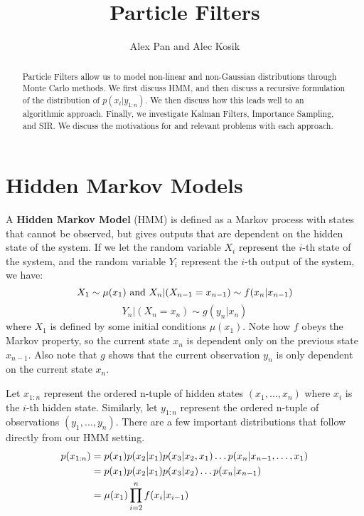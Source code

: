 \documentclass{article}
\title{\vspace{-2cm}Particle Filters} %
\author{Alex Pan and Alec Kosik}
\date{} %
\begin{document}
\maketitle

\begin{abstract}
Particle Filters allow us to model non-linear and non-Gaussian distributions through Monte Carlo methods. We first discuss HMM, and then discuss a recursive formulation of the distribution of $p(x_t|y_{1:n})$. We then discuss how this leads well to an algorithmic approach. Finally, we investigate Kalman Filters, Importance Sampling, and SIR. We discuss the motivations for and relevant problems with each approach.
\end{abstract}

\section{Hidden Markov Models}

A \textbf{Hidden Markov Model} (HMM) is defined as a Markov process with states that cannot be observed, but gives outputs that are dependent on the hidden state of the system. If we let the random variable $X_i$ represent the $i$-th state of the system, and the random variable $Y_i$ represent the $i$-th output of the system, we have:
\begin{equation}
X_1 \sim \mu (x_1) \textnormal{ and } X_n|(X_{n-1}=x_{n-1}) \sim f(x_n|x_{n-1})
\end{equation}
\begin{equation}
Y_n|(X_n = x_n) \sim g(y_n|x_n)
\end{equation}
where $X_1$ is defined by some initial conditions $\mu(x_1)$. Note how $f$ obeys the Markov property, so the current state $x_n$ is dependent only on the previous state $x_{n-1}$. Also note that $g$ shows that the current observation $y_n$ is only dependent on the current state $x_n$.

Let $x_{1:n}$ represent the ordered n-tuple of hidden states $(x_1,\dots,x_n)$ where $x_i$ is the $i$-th hidden state. Similarly, let $y_{1:n}$ represent the ordered n-tuple of observations $(y_1,\dots,y_n)$. There are a few important distributions that follow directly from our HMM setting.
\begin{equation} \label{p(x_{1:n})}
\begin{split}
p(x_{1:n})
&= p(x_1)p(x_2|x_1)p(x_3|x_2,x_1)\dots p(x_n|x_{n-1},\dots,x_1)\\
&= p(x_1)p(x_2|x_1)p(x_3|x_2)\dots p(x_n|x_{n-1})\\
&=\mu(x_1)\prod_{i=2}^{n} f(x_i|x_{i-1})\\
\end{split}
\end{equation}
\end{document}
